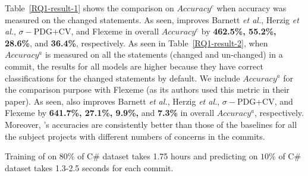 

Table~\ref{RQ1-result-1} shows the comparison on $Accuracy^{c}$ when
accuracy was measured on the changed statements. As seen, {\tool}
improves Barnett {\em et al.}, Herzig {\em et al.}, $\sigma-$PDG+CV,
and Flexeme in overall $Accuracy^c$ by {\bf 462.5\%, 55.2\%, 28.6\%},
and {\bf 36.4\%}, respectively. As seen in Table~\ref{RQ1-result-2},
when $Accuracy^{a}$ is measured on all the statements (changed and
un-changed) in a commit, the results for all models are higher because
they have correct classifications for the changed statements by
default. We include $Accuracy^{a}$ for the comparison purpose with
Flexeme (as its authors used this metric in their paper). As seen,
{\tool} also improves Barnett {\em et al.}, Herzig {\em et al.},
$\sigma-$PDG+CV, and Flexeme by {\bf 641.7\%, 27.1\%, 9.9\%,} and {\bf
  7.3\%} in overall $Accuracy^{a}$, respectively. Moreover, {\tool}'s
accuracies are consistently better than those of the baselines for all
the subject projects with different numbers of concerns in the
commits. 

Training of \tool on $80\%$ of C\# dataset takes 1.75 hours and predicting on $10\%$ of C\# dataset takes 1.3-2.5 seconds for each commit.

{\color{red}{why some data points are not available?}}



